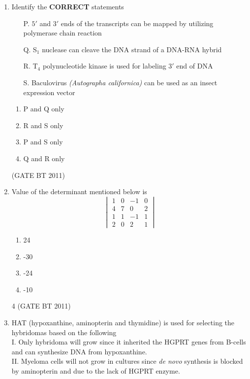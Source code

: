 \documentclass[journal,12pt,onecolumn]{IEEEtran}
\begin{document}
\begin{enumerate}
  \item Identify the \textbf{CORRECT} statements
  \begin{enumerate}
    \item[P.] $5'$ and $3'$ ends of the transcripts can be mapped by utilizing polymerase chain reaction
    \item[Q.] S$_1$ nuclease can cleave the DNA strand of a DNA-RNA hybrid
    \item[R.] T$_4$ polynucleotide kinase is used for labeling $3'$ end of DNA
    \item[S.] Baculovirus \textit{(Autographa californica)} can be used as an insect expression vector
  \end{enumerate}

  \begin{multicols}{2}
    \begin{enumerate}
      \item P and Q only
      \item R and S only
      \item P and S only
      \item Q and R only
    \end{enumerate}
  \end{multicols} \hfill(GATE BT 2011)

  \item Value of the determinant mentioned below is
  \[
  \begin{vmatrix}
  1 & 0 & -1 & 0 \\
  4 & 7 & 0 & 2 \\
  1 & 1 & -1 & 1 \\
  2 & 0 & 2 & 1
  \end{vmatrix}
  \]

   \begin{multicols}{4}   
    \begin{enumerate}
      \item 24
      \item -30
      \item -24
      \item -10
    \end{enumerate}
    \end{multicols}{4} \hfill(GATE BT 2011)
    

  \item HAT (hypoxanthine, aminopterin and thymidine) is used for selecting the hybridomas based on the following \\
  I. Only hybridoma will grow since it inherited the HGPRT genes from B-cells and can synthesize DNA from hypoxanthine. \\
  II. Myeloma cells will not grow in cultures since \textit{de novo} synthesis is blocked by aminopterin and due to the lack of HGPRT enzyme.


\end{enumerate}
\end{document}
